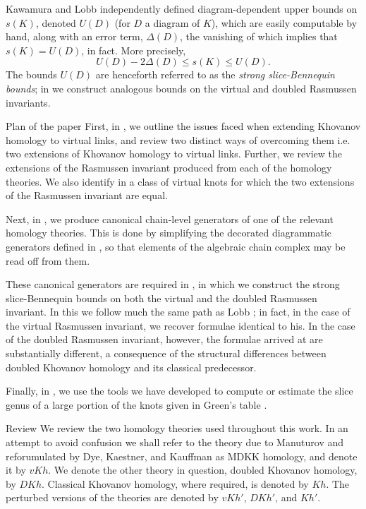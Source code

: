 \documentclass[10pt,oneside]{amsart}
\theoremstyle{definition}
\numberwithin{equation}{section}
\begin{document}
Kawamura \cite{Kawamura2015a} and Lobb \cite{Lobb2011} independently defined diagram-dependent upper bounds on \( s (K) \), denoted \( U ( D ) \) (for \( D \) a diagram of \( K \)), which are easily computable by hand, along with an error term, \( \Delta ( D ) \), the vanishing of which implies that \( s ( K ) = U ( D ) \), in fact. More precisely,
\begin{equation*}
U ( D ) - 2 \Delta ( D ) \leq s ( K ) \leq U ( D ).
\end{equation*}
The bounds \( U ( D ) \) are henceforth referred to as the \emph{strong slice-Bennequin bounds}; in  we construct analogous bounds on the virtual and doubled Rasmussen invariants.

{		{\normalfont\bfseries\large}}{Plan of the paper}
First, in , we outline the issues faced when extending Khovanov homology to virtual links, and review two distinct ways of overcoming them i.e. two extensions of Khovanov homology to virtual links. Further, we review the extensions of the Rasmussen invariant produced from each of the homology theories. We also identify in  a class of virtual knots for which the two extensions of the Rasmussen invariant are equal.

Next, in , we produce canonical chain-level generators of one of the relevant homology theories. This is done by simplifying the decorated diagrammatic generators defined in \cite{Dye2014}, so that elements of the algebraic chain complex may be read off from them.

These canonical generators are required in , in which we construct the strong slice-Bennequin bounds on both the virtual and the doubled Rasmussen invariant. In this we follow much the same path as Lobb \cite{Lobb2011}; in fact, in the case of the virtual Rasmussen invariant, we recover formulae identical to his. In the case of the doubled Rasmussen invariant, however, the formulae arrived at are substantially different, a consequence of the structural differences between doubled Khovanov homology and its classical predecessor.

Finally, in , we use the tools we have developed to compute or estimate the slice genus of a large portion of the knots given in Green's table \cite{Green}.

{	\z@{-1.2\linespacing\@plus-.5\linespacing}{.8\linespacing}	{\normalfont\bfseries\Large}}{Review}\label{Sec:review}
We review the two homology theories used throughout this work. In an attempt to avoid confusion we shall refer to the theory due to Manuturov and reforumulated by Dye, Kaestner, and Kauffman as MDKK homology, and denote it by \( {vKh} \). We denote the other theory in question, doubled Khovanov homology, by \( {DKh} \). Classical Khovanov homology, where required, is denoted by \( {{Kh}} \). The perturbed versions of the theories are denoted by \( {vKh} ' \), \( {DKh} ' \), and \( {{Kh}} ' \).
\end{document}
